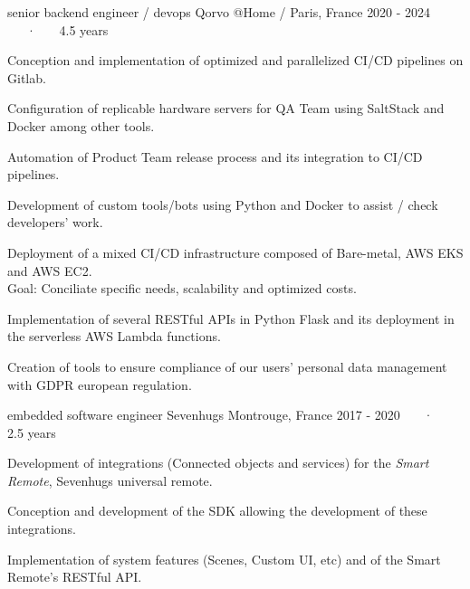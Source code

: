 \begin{cventries}
  \cventry
    {senior backend engineer / devops} %
    {Qorvo} %
    {@Home / Paris, France} %
    {2020 - 2024 ~~~·~~~ 4.5 years} %
    {
      \begin{cvitems} %
        \item{Conception and implementation of optimized and parallelized CI/CD pipelines on Gitlab.}
        \item{Configuration of replicable hardware servers for QA Team using SaltStack and Docker among other tools.}
        \item{Automation of Product Team release process and its integration to CI/CD pipelines.}
        \item{Development of custom tools/bots using Python and Docker to assist / check developers' work.}
        \item{Deployment of a mixed CI/CD infrastructure composed of Bare-metal, AWS EKS and AWS EC2.\\
        Goal: Conciliate specific needs, scalability and optimized costs.}
        \item{Implementation of several RESTful APIs in Python Flask and its deployment in the serverless AWS Lambda functions.}
        \item{Creation of tools to ensure compliance of our users' personal data management with GDPR european regulation.}
      \end{cvitems}
    }

  \cventry
    {embedded software engineer} %
    {Sevenhugs} %
    {Montrouge, France} %
    {2017 -  2020 ~~~·~~~ 2.5 years} %
    {
      \begin{cvitems} %
        \item {Development of integrations (Connected objects and services) for the \textit{Smart Remote}, Sevenhugs universal remote.}
        \item {Conception and development of the SDK allowing the development of these integrations.}
        \item {Implementation of system features (Scenes, Custom UI, etc) and of the Smart Remote's RESTful API.}
      \end{cvitems}
    }


\end{cventries}
